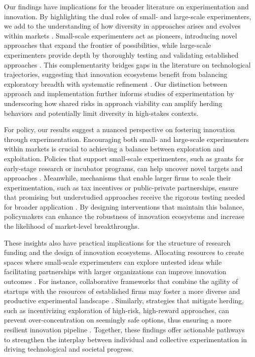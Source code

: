 Our findings have implications for the broader literature on experimentation and innovation. By highlighting the dual roles of small- and large-scale experimenters, we add to the understanding of how diversity in approaches arises and evolves within markets \citep{cohen1992tradeoff}. Small-scale experimenters act as pioneers, introducing novel approaches that expand the frontier of possibilities, while large-scale experimenters provide depth by thoroughly testing and validating established approaches \citep{kotha2011entry, ahuja2001entrepreneurship}. This complementarity bridges gaps in the literature on technological trajectories, suggesting that innovation ecosystems benefit from balancing exploratory breadth with systematic refinement \citep{luger2018dynamic, fang2010balancing, chen2008rival}. Our distinction between approach and implementation further informs studies of experimentation by underscoring how shared risks in approach viability can amplify herding behaviors and potentially limit diversity in high-stakes contexts.

For policy, our results suggest a nuanced perspective on fostering innovation through experimentation. Encouraging both small- and large-scale experimenters within markets is crucial to achieving a balance between exploration and exploitation. Policies that support small-scale experimenters, such as grants for early-stage research or incubator programs, can help uncover novel targets and approaches \citep{bradley2021policy}. Meanwhile, mechanisms that enable larger firms to scale their experimentation, such as tax incentives or public-private partnerships, ensure that promising but understudied approaches receive the rigorous testing needed for broader application \citep{dimos2016effectiveness, lerner2009boulevard}. By designing interventions that maintain this balance, policymakers can enhance the robustness of innovation ecosystems and increase the likelihood of market-level breakthroughs.

These insights also have practical implications for the structure of research funding and the design of innovation ecosystems. Allocating resources to create spaces where small-scale experimenters can explore untested ideas while facilitating partnerships with larger organizations can improve innovation outcomes \citep{cappelen2012effects}. For instance, collaborative frameworks that combine the agility of startups with the resources of established firms may foster a more diverse and productive experimental landscape \citep{polidoro2021corporate, bhaskaran2009effort}. Similarly, strategies that mitigate herding, such as incentivizing exploration of high-risk, high-reward approaches, can prevent over-concentration on seemingly safe options, thus ensuring a more resilient innovation pipeline \citep{von2020exploration}. Together, these findings offer actionable pathways to strengthen the interplay between individual and collective experimentation in driving technological and societal progress.

